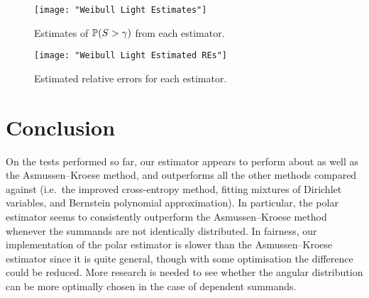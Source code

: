 \begin{figure}[H]
	\centering
	\texttt{[image: "Weibull Light Estimates"]}
	\caption{Estimates of $\operatorname{{\mathbb P}}(S > \gamma)$ from each estimator.}
\end{figure}

\begin{figure}[H]
	\centering
	\texttt{[image: "Weibull Light Estimated REs"]}
	\caption{Estimated relative errors for each estimator.}
\end{figure}


\section{Conclusion} \label{Sec:Conclusion}

On the tests performed so far, our estimator appears to perform about as well as the Asmussen--Kroese method, and outperforms all the other methods compared against (i.e.\ the improved cross-entropy method, fitting mixtures of Dirichlet variables, and Bernstein polynomial approximation). In particular, the polar estimator seems to consistently outperform the Asmussen--Kroese method whenever the summands are not identically distributed. In fairness, our implementation of the polar estimator is slower than the Asmussen--Kroese estimator since it is quite general, though with some optimisation the difference could be reduced. More research is needed to see whether the angular distribution can be more optimally chosen in the case of dependent summands.